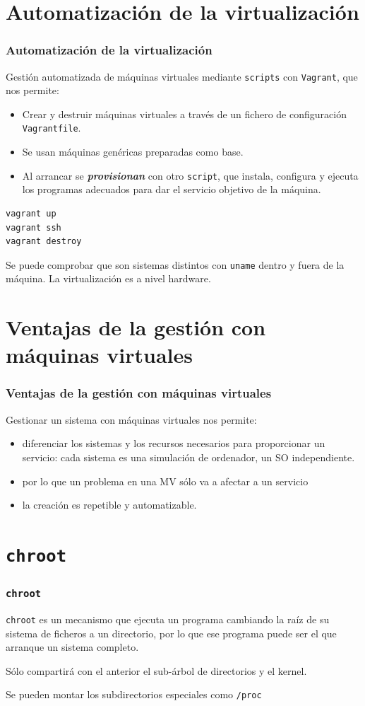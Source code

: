 \documentclass[xcolor=dvipsnames]{beamer}
\begin{document}
\section{Automatización de la virtualización}
\begin{frame}[fragile]
	\frametitle{Automatización de la virtualización}
	
	Gestión automatizada de máquinas virtuales mediante \texttt{scripts} con \texttt{Vagrant}, que nos permite:
	\begin{itemize}
		\item Crear y destruir máquinas virtuales a través de un fichero de configuración \texttt{Vagrantfile}.
		\item Se usan máquinas genéricas preparadas como base.
		\item Al arrancar se \textit{\textbf{provisionan}} con otro \texttt{script}, que instala, configura y ejecuta los programas adecuados para dar el servicio objetivo de la máquina.
	\end{itemize}
	
	\begin{lstlisting}
vagrant up
vagrant ssh
vagrant destroy
	\end{lstlisting}
	
	Se puede comprobar que son sistemas distintos con \texttt{uname} dentro y fuera de la máquina. La virtualización es a nivel hardware.
\end{frame}

\section{Ventajas de la gestión con máquinas virtuales}
\begin{frame}[fragile]
	\frametitle{Ventajas de la gestión con máquinas virtuales}

Gestionar un sistema con máquinas virtuales nos permite:
		\begin{itemize}
			\item diferenciar los sistemas y los recursos necesarios para proporcionar un servicio: cada sistema es una simulación de ordenador, un SO independiente.
			\item por lo que un problema en una MV sólo va a afectar a un servicio
			\item la creación es repetible y automatizable.
		\end{itemize}
\end{frame}

\section{\texttt{chroot}}
\begin{frame}[fragile]
	\frametitle{\texttt{chroot}}
	\texttt{chroot} es un mecanismo que ejecuta un programa cambiando la raíz de su sistema de ficheros a un directorio, por lo que ese programa puede ser el que arranque un sistema completo. 

	Sólo compartirá con el anterior el sub-árbol de directorios y el kernel. 

	Se pueden montar los subdirectorios especiales como \texttt{/proc}

\end{frame}
\end{document}
